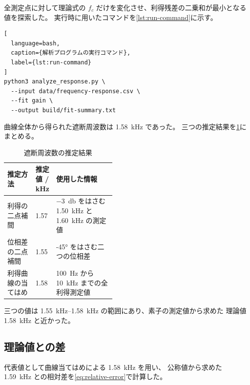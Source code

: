 全測定点に対して理論式の $f_c$ だけを変化させ、利得残差の二乗和が最小となる値を探索した。
実行時に用いたコマンドを\cref{lst:run-command}に示す。

\begin{lstlisting}[
  language=bash,
  caption={解析プログラムの実行コマンド},
  label={lst:run-command}
]
python3 analyze_response.py \
  --input data/frequency-response.csv \
  --fit gain \
  --output build/fit-summary.txt
\end{lstlisting}


曲線全体から得られた遮断周波数は \qty{1.58}{\kilo\hertz} であった。
三つの推定結果を\cref{tab:cutoff-estimates}にまとめる。

\begin{table}[H]
  \centering
  \caption{遮断周波数の推定結果}
  \label{tab:cutoff-estimates}
  \begin{tabularx}{0.88\linewidth}{
      >{\raggedright\arraybackslash}p{0.26\linewidth}
      >{\centering\arraybackslash}p{0.18\linewidth}
      >{\raggedright\arraybackslash}X}
    \toprule
    推定方法 & 推定値 / \unit{\kilo\hertz} & 使用した情報 \\
    \midrule
    利得の二点補間 & \num{1.57} & \qty{-3}{\decibel} をはさむ \qty{1.50}{\kilo\hertz} と \qty{1.60}{\kilo\hertz} の測定値 \\
    位相差の二点補間 & \num{1.55} & \ang{-45} をはさむ二つの位相差 \\
    利得曲線の当てはめ & \num{1.58} & \qty{100}{\hertz} から \qty{10}{\kilo\hertz} までの全利得測定値 \\
    \bottomrule
  \end{tabularx}
\end{table}

三つの値は \qtyrange{1.55}{1.58}{\kilo\hertz} の範囲にあり、素子の測定値から求めた
理論値 \qty{1.58}{\kilo\hertz} と近かった。

\subsection{理論値との差}
\label{subsec:relative-error}

代表値として曲線当てはめによる \qty{1.58}{\kilo\hertz} を用い、
公称値から求めた \qty{1.59}{\kilo\hertz} との相対差を\cref{eq:relative-error}で計算した。

